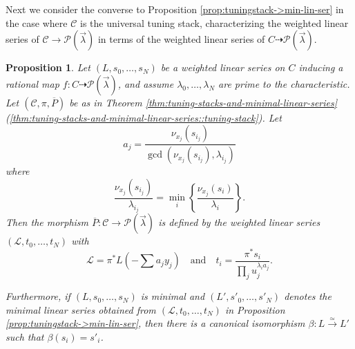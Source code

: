 \documentclass[a4paper,12pt]{amsart}
\newtheorem{prop}[thm]{Proposition}
\theoremstyle{definition}
\newcommand{\cC}{\mathcal{C}}
\newcommand{\Pcv}{\mathcal{P}(\vec{\lambda})}
\begin{document}
	
	
	
	Next we consider the converse to Proposition \ref{prop:tuningstack->min-lin-ser} in the case where $\cC$ is the universal tuning stack, characterizing the weighted linear series of $\cC\to\Pcv$ in terms of the weighted linear series of $C\dasharrow\Pcv$.
	
	\begin{prop}\label{prop:lin-ser->univ-tuning-stack-map}
		Let $(L, s_0,\ldots, s_N)$ be a weighted linear series on $C$ inducing a rational map $f\colon C\dasharrow\Pcv$, and assume $\lambda_0,\dots,\lambda_N$ are prime to the characteristic. Let $(\cC,\pi,\overline{P})$ be as in Theorem \ref{thm:tuning-stacks-and-minimal-linear-series} (\ref{thm:tuning-stacks-and-minimal-linear-series::tuning-stack}). Let 
		\[
		a_j = \frac{\nu_{x_j}(s_{i_j})}{\gcd(\nu_{x_j}(s_{i_j}),\lambda_{i_j})}
		\]
		where
		\[
		\frac{\nu_{x_j}(s_{i_j})}{\lambda_{i_j}}=\min_i\left\{\frac{\nu_{x_j}(s_i)}{\lambda_i}\right\}.
		\]
		Then the morphism $\overline{P}\colon\cC\to\Pcv$ is defined by the weighted linear series $(\mathcal{L},t_0,\dots,t_N)$ with
		\[
		\mathcal{L}=\pi^*L(-\sum a_j y_j)\quad\textrm{and}\quad
		t_i = \frac{\pi^*s_i}{\prod_j u_j^{\lambda_i a_j}}.
		\]
		
		Furthermore, if $(L,s_0,\dots,s_N)$ is minimal and $(L',s'_0,\dots,s'_N)$ denotes the minimal linear series obtained from $(\mathcal{L},t_0,\dots,t_N)$ in Proposition \ref{prop:tuningstack->min-lin-ser}, then there is a canonical isomorphism $\beta\colon L\xrightarrow{\simeq} L'$ such that $\beta(s_i)=s'_i$.
	\end{prop}
	
\end{document}
